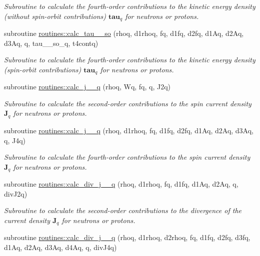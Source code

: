 \begin{DoxyCompactItemize}
\begin{DoxyCompactList}\small\item\em Subroutine to calculate the fourth-\/order contributions to the kinetic energy density (without spin-\/orbit contributions) $\textbf{tau}_q$ for neutrons or protons. \end{DoxyCompactList}\item 
subroutine \mbox{\hyperlink{namespaceroutines_a8825f02bb2ac98507fff5024d9b54c8f}{routines\+::calc\+\_\+tau\+\_\+\_\+so}} (rhoq, d1rhoq, fq, d1fq, d2fq, d1\+Aq, d2\+Aq, d3\+Aq, q, tau\+\_\+\_\+so\+\_\+q, t4contq)
\begin{DoxyCompactList}\small\item\em Subroutine to calculate the fourth-\/order contributions to the kinetic energy density (spin-\/orbit contributions) $\textbf{tau}_q$ for neutrons or protons. \end{DoxyCompactList}\item 
subroutine \mbox{\hyperlink{namespaceroutines_af03f37f9deca52ef9a56287f50b982a1}{routines\+::calc\+\_\+j\+\_\+\_\+q}} (rhoq, Wq, fq, q, J2q)
\begin{DoxyCompactList}\small\item\em Subroutine to calculate the second-\/order contributions to the spin current density $\textbf{J}_q$ for neutrons or protons. \end{DoxyCompactList}\item 
subroutine \mbox{\hyperlink{namespaceroutines_a014fed5fe5fbc19302e7cbc651ba59bd}{routines\+::calc\+\_\+j\+\_\+\_\+q}} (rhoq, d1rhoq, fq, d1fq, d2fq, d1\+Aq, d2\+Aq, d3\+Aq, q, J4q)
\begin{DoxyCompactList}\small\item\em Subroutine to calculate the fourth-\/order contributions to the spin current density $\textbf{J}_q$ for neutrons or protons. \end{DoxyCompactList}\item 
subroutine \mbox{\hyperlink{namespaceroutines_a136b7a1f0387466390decb98ce91c152}{routines\+::calc\+\_\+div\+\_\+j\+\_\+\_\+q}} (rhoq, d1rhoq, fq, d1fq, d1\+Aq, d2\+Aq, q, div\+J2q)
\begin{DoxyCompactList}\small\item\em Subroutine to calculate the second-\/order contributions to the divergence of the current density $\textbf{J}_q$ for neutrons or protons. \end{DoxyCompactList}\item 
subroutine \mbox{\hyperlink{namespaceroutines_a7f66729f05be35eda4266dbf47eda026}{routines\+::calc\+\_\+div\+\_\+j\+\_\+\_\+q}} (rhoq, d1rhoq, d2rhoq, fq, d1fq, d2fq, d3fq, d1\+Aq, d2\+Aq, d3\+Aq, d4\+Aq, q, div\+J4q)

\end{DoxyCompactItemize}
